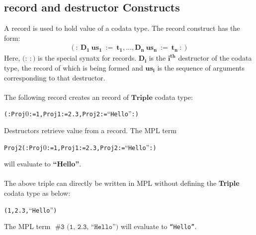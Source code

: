 \documentclass[11pt]{article}
\begin{document}
\subsection {record and destructor Constructs}
A {\sf record} is used to hold value of a codata type. The {\sf record} construct has the form:
  \begin{align*}
    \mathbf{(:~D_1~us_1~:=~t_1,\ldots,D_n~us_n~:=~t_n~:)}
  \end{align*}
Here, $\mathbf(:~:)$ is the special synatx for records. $\mathbf{D_i}$ is the $\mathbf{i^{th}}$ destructor of the codata type, the record of which is being formed and $\mathbf{us_i}$ is the sequence of arguments corresponding to that destructor.
~~\\~~\\
The following record creates an record of $\mathbf{Triple}$ codata type:
\begin{alltt}
              (: Proj\(0\) := 1 , Proj1 := 2.3 , Proj2 := ``Hello'' :)
\end{alltt}
{\sf Destructors} retrieve value from a record. The MPL term 
\begin{alltt}
              Proj2 (: Proj\(0\) := 1 , Proj1 := 2.3 , Proj2 := ``Hello'' :)
\end{alltt}
will evaluate to {\bf ``Hello''}.
~~\\~~\\ 
The above triple can directly be written in MPL without defining the {\bf Triple} codata type as below:
\begin{alltt}
              (1, 2.3, ``Hello'')
\end{alltt}
The MPL term $\mathbf{\texttt{~\#3~(1,~2.3,~``Hello'')}}$ will evaluate to \texttt{``Hello''}.
\end{document}
